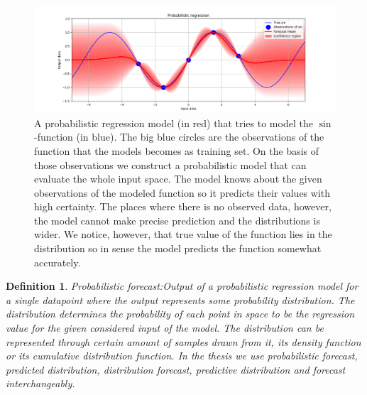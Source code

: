 \documentclass[12pt,a4paper,twoside]{scrartcl}
\newtheorem{definition}[theorem]{Definition}
\numberwithin{equation}{section}
\begin{document}
\vfill
  \begin{figure}[ht]
    \centering
    \includegraphics[height=0.5\textwidth, width=1\textwidth]{figures/probabilistic_regression.png}
    \caption[Probabilistic regression example model]{A probabilistic regression model (in red) that tries to model the \(\sin\)-function (in blue). The big blue circles are the observations of the function that the models becomes as training set. On the basis of those observations we construct a probabilistic model that can evaluate the whole input space. The model knows about the given observations of the modeled function so it predicts their values with high certainty. The places where there is no observed data, however, the model cannot make precise prediction and the distributions is wider. We notice, however, that true value of the function lies in the distribution so in sense the model predicts the function somewhat accurately.}\label{fig:prob-regression}
  \end{figure}
\vspace{-2cm}
\begin{definition}{Probabilistic forecast:}\label{def:prob-for}
  Output of a probabilistic regression model for a single datapoint where the output represents some probability distribution. The distribution determines the probability of each point in space to be the regression value for the given considered input of the model. The distribution can be represented through certain amount of samples drawn from it, its density function or its cumulative distribution function. In the thesis we use probabilistic forecast, predicted distribution, distribution forecast, predictive distribution and forecast interchangeably.
\end{definition}
\vfill
\end{document}
